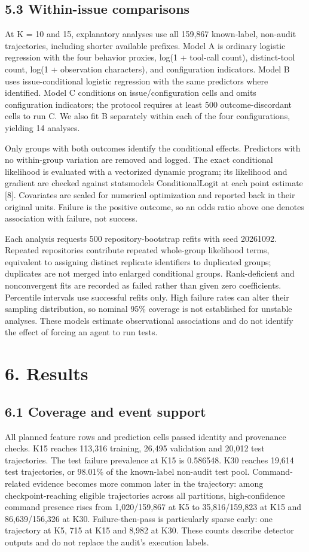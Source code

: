 \documentclass[10pt,a4paper]{article}
\begin{document}
\subsection{5.3 Within-issue comparisons}
At K = 10 and 15, explanatory analyses use all 159,867 known-label, non-audit trajectories, including shorter available prefixes. Model A is ordinary logistic regression with the four behavior proxies, log(1 + tool-call count), distinct-tool count, log(1 + observation characters), and configuration indicators. Model B uses issue-conditional logistic regression with the same predictors where identified. Model C conditions on issue/configuration cells and omits configuration indicators; the protocol requires at least 500 outcome-discordant cells to run C. We also fit B separately within each of the four configurations, yielding 14 analyses.

Only groups with both outcomes identify the conditional effects. Predictors with no within-group variation are removed and logged. The exact conditional likelihood is evaluated with a vectorized dynamic program; its likelihood and gradient are checked against statsmodels ConditionalLogit at each point estimate [8]. Covariates are scaled for numerical optimization and reported back in their original units. Failure is the positive outcome, so an odds ratio above one denotes association with failure, not success.

Each analysis requests 500 repository-bootstrap refits with seed 20261092. Repeated repositories contribute repeated whole-group likelihood terms, equivalent to assigning distinct replicate identifiers to duplicated groups; duplicates are not merged into enlarged conditional groups. Rank-deficient and nonconvergent fits are recorded as failed rather than given zero coefficients. Percentile intervals use successful refits only. High failure rates can alter their sampling distribution, so nominal 95\% coverage is not established for unstable analyses. These models estimate observational associations and do not identify the effect of forcing an agent to run tests.

\section{6. Results}
\subsection{6.1 Coverage and event support}
All planned feature rows and prediction cells passed identity and provenance checks. K15 reaches 113,316 training, 26,495 validation and 20,012 test trajectories. The test failure prevalence at K15 is 0.586548. K30 reaches 19,614 test trajectories, or 98.01\% of the known-label non-audit test pool. Command-related evidence becomes more common later in the trajectory: among checkpoint-reaching eligible trajectories across all partitions, high-confidence command presence rises from 1,020/159,867 at K5 to 35,816/159,823 at K15 and 86,639/156,326 at K30. Failure-then-pass is particularly sparse early: one trajectory at K5, 715 at K15 and 8,982 at K30. These counts describe detector outputs and do not replace the audit's execution labels.
\end{document}
